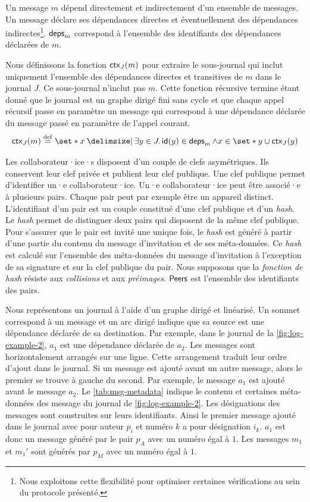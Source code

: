 Un message $m$ dépend directement et indirectement d'un ensemble de messages.
Un message déclare ses dépendances directes et éventuellement des dépendances indirectes\footnote{Nous exploitons cette flexibilité pour optimiser certaines vérifications au sein du protocole présenté.}.
$\operatorname{\mathsf{deps}}_m$ correspond à l'ensemble des identifiants des dépendances déclarées de $m$.

Nous définissons la fonction $\operatorname{\mathsf{ctx}}_J(m)$ pour extraire le sous-journal qui inclut uniquement l'ensemble des dépendances directes et transitives de $m$ dans le journal $J$.
Ce sous-journal n'inclut pas $m$.
Cette fonction récursive termine étant donné que le journal est un graphe dirigé fini sans cycle et que chaque appel récursif passe en paramètre un message qui correspond à une dépendance déclarée du message passé en paramètre de l'appel courant.
%
\begin{equation*}
    \trm{ctx}_J(m) \defeq \set*{ x \given \exists y \in J \qsep \trm{id}(y) \in \trm{deps}_m \land x \in \set*{y} \cup \trm{ctx}_J(y)}
\end{equation*}

Les collaborateur·ice·s disposent d'un couple de clefs asymétriques.
Ils conservent leur clef privée et publient leur clef publique.
Une clef publique permet d'identifier un·e collaborateur·ice.
Un·e collaborateur·ice peut être associé·e à plusieurs pairs.
Chaque pair peut par exemple être un appareil distinct.
L'identifiant d'un pair est un couple constitué d'une clef publique et d'un \emph{hash}.
Le \emph{hash} permet de distinguer deux pairs qui disposent de la même clef publique.
Pour s'assurer que le pair est invité une unique fois, le \emph{hash} est généré à partir d'une partie du contenu du message d'invitation et de ses méta-données.
Ce \emph{hash} est calculé sur l'ensemble des méta-données du message d'invitation à l'exception de sa signature et sur la clef publique du pair.
Nous supposons que la \emph{fonction de hash} résiste aux \emph{collisions} et aux \emph{préimages}.
$\operatorname{\mathsf{Peers}}$ est l'ensemble des identifiants des pairs.

Nous représentons un journal à l'aide d'un graphe dirigé et linéarisé.
Un sommet correspond à un message et un arc dirigé indique que sa source est une dépendance déclarée de sa destination.
Par exemple, dans le journal de la \autoref{fig:log-example-2}, $a_1$ est une dépendance déclarée de $a_2$.
Les messages sont horizontalement arrangés sur une ligne.
Cette arrangement traduit leur ordre d'ajout dans le journal.
Si un message est ajouté avant un autre message, alors le premier se trouve à gauche du second.
Par exemple, le message $a_1$ est ajouté avant le message $a_2$.
Le \autoref{tab:msg-metadata} indique le contenu et certaines méta-données des message du journal de \autoref{fig:log-example-2}.
Les désignations des messages sont construites sur leurs identifiants.
Ainsi le premier message ajouté dans le journal avec pour auteur $p_i$ et numéro $k$ a pour désignation $i_k$.
$a_1$ est donc un message généré par le pair $p_A$ avec un numéro égal à $1$.
Les messages $m_1$ et $m_1'$ sont générés par $p_M$ avec un numéro égal à $1$.

